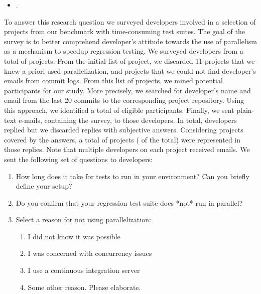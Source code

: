 \begin{itemize}
	\item \numRQE{}. \textbf{\RQE{}}
\end{itemize}


To answer this research question we surveyed developers involved in a
selection of projects from our benchmark with time-consuming test
suites.  The goal of the survey is to better comprehend developer's
attitude towards the use of parallelism as a mechanism to speedup
regression testing.  We surveyed developers from a total of
\emailsProjects{} projects.  From the initial list of \numMedLong{}
project, we discarded 11 projects that we knew a priori used
parallelization, and \discartedProjects{} projects that we could not find
developer's emails from commit logs.  From this list of projects, we
mined potential participants for our study.  More precisely, we
searched for developer's name and email from the last 20 commits to
the corresponding project repository.  Using this approach, we
identified a total of \emailsSent{} eligible participants.  Finally,
we sent plain-text e-mails, containing the survey, to those developers.  In
total, \emailsAnswered{} developers replied but we discarded
\emailsFalseAnswers{} replies with subjective answers.  Considering
projects covered by the answers, a total of \emailsProjectsAnswered{}
projects (\percEmailsProjectsAnswered{} of the total) were represented
in those replies.  Note that multiple developers on each project
received emails.  We sent the following set of questions to
developers:

\begin{enumerate}
\item How long does it take for tests to run in your environment? Can
  you briefly define your setup?
\item Do you confirm that your regression test suite does *not* run in parallel?
\item\label{questionThree} Select a reason for not using parallelization:
  \begin{enumerate}[label=\alph*)]
  \item I did not know it was possible
  \item I was concerned with concurrency issues
  \item I use a continuous integration server
  \item Some other reason. Please elaborate.
  \end{enumerate}
\end{enumerate}


